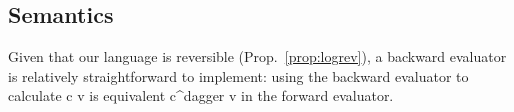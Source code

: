 \documentclass[preprint]{sigplanconf}
\begin{document}
\begin{multicols}{2}
\begin{center}
\end{center}
  
\begin{center}
\end{center}  
\end{multicols}

\subsection{Semantics}


Given that our language is reversible (Prop.~\ref{prop:logrev}), a backward
evaluator is relatively straightforward to implement: using the backward
evaluator to calculate {{c v}} is equivalent {{c^{dagger} v}} in the forward
evaluator.

\end{document}
